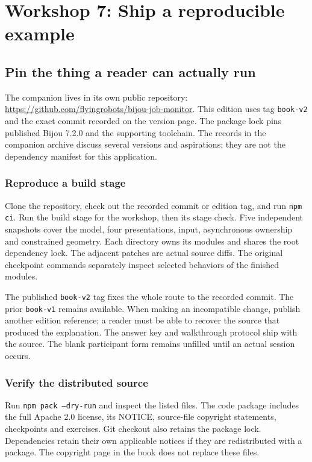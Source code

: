 \chapter{Workshop 7: Ship a reproducible example}\label{workshop-07}

\section{Pin the thing a reader can actually run}

The companion lives in its own public repository: \url{https://github.com/flyingrobots/bijou-job-monitor}. This edition uses tag \texttt{book-v2} and the exact commit recorded on the version page. The package lock pins published Bijou 7.2.0 and the supporting toolchain. The records in the companion archive discuss several versions and aspirations; they are not the dependency manifest for this application.

\subsection{Reproduce a build stage}

Clone the repository, check out the recorded commit or edition tag, and run \texttt{npm ci}. Run the build stage for the workshop, then its stage check. Five independent snapshots cover the model, four presentations, input, asynchronous ownership and constrained geometry. Each directory owns its modules and shares the root dependency lock. The adjacent patches are actual source diffs. The original checkpoint commands separately inspect selected behaviors of the finished modules.

The published \texttt{book-v2} tag fixes the whole route to the recorded commit. The prior \texttt{book-v1} remains available. When making an incompatible change, publish another edition reference; a reader must be able to recover the source that produced the explanation. The answer key and walkthrough protocol ship with the source. The blank participant form remains unfilled until an actual session occurs.

\subsection{Verify the distributed source}

Run \texttt{npm pack --dry-run} and inspect the listed files. The code package includes the full Apache 2.0 license, its NOTICE, source-file copyright statements, checkpoints and exercises. Git checkout also retains the package lock. Dependencies retain their own applicable notices if they are redistributed with a package. The copyright page in the book does not replace these files.

